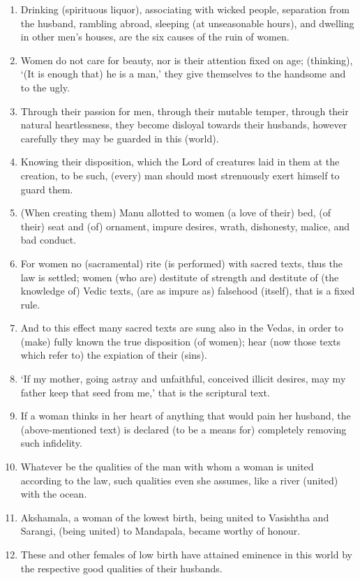 \begin{enumerate}
\item Drinking (spirituous liquor), associating with wicked people, separation from the husband, rambling abroad, sleeping (at unseasonable hours), and dwelling in other men's houses, are the six causes of the ruin of women.
\item Women do not care for beauty, nor is their attention fixed on age; (thinking), `(It is enough that) he is a man,' they give themselves to the handsome and to the ugly.
\item Through their passion for men, through their mutable temper, through their natural heartlessness, they become disloyal towards their husbands, however carefully they may be guarded in this (world).
\item Knowing their disposition, which the Lord of creatures laid in them at the creation, to be such, (every) man should most strenuously exert himself to guard them.
\item (When creating them) Manu allotted to women (a love of their) bed, (of their) seat and (of) ornament, impure desires, wrath, dishonesty, malice, and bad conduct.
\item For women no (sacramental) rite (is performed) with sacred texts, thus the law is settled; women (who are) destitute of strength and destitute of (the knowledge of) Vedic texts, (are as impure as) falsehood (itself), that is a fixed rule.
\item And to this effect many sacred texts are sung also in the Vedas, in order to (make) fully known the true disposition (of women); hear (now those texts which refer to) the expiation of their (sins).
\item `If my mother, going astray and unfaithful, conceived illicit desires, may my father keep that seed from me,' that is the scriptural text.
\item If a woman thinks in her heart of anything that would pain her husband, the (above-mentioned text) is declared (to be a means for) completely removing such infidelity.
\item Whatever be the qualities of the man with whom a woman is united according to the law, such qualities even she assumes, like a river (united) with the ocean.
\item Akshamala, a woman of the lowest birth, being united to Vasishtha and Sarangi, (being united) to Mandapala, became worthy of honour.
\item These and other females of low birth have attained eminence in this world by the respective good qualities of their husbands.

\end{enumerate}
